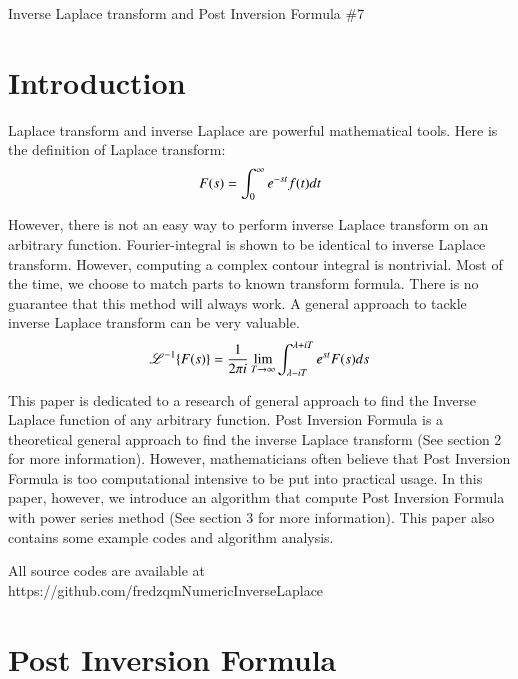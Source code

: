 \documentclass[12pt]{article}
\begin{document}
\centerline{\Large Inverse Laplace transform and Post Inversion Formula \#7}
\vspace{1cm}

\newsavebox\foobox
\newlength{\foodim}
\newcommand{\slantbox}[2][0]{\mbox{%
        \sbox{\foobox}{#2}%
        \foodim=#1\wd\foobox
        \hskip \wd\foobox
        \hskip -0.5\foodim
        \pdfsave
        \pdfsetmatrix{1 0 #1 1}%
        \llap{\usebox{\foobox}}%
        \pdfrestore
        \hskip 0.5\foodim
}}
\def\Laplace{\ThisStyle{\slantbox[-.45]{$\SavedStyle\mathscr{L}$}}}


\section{Introduction}

Laplace transform and inverse Laplace are powerful mathematical tools. Here is the definition of Laplace transform:
$$F(s) = \int_{0}^{\infty} e^{-st} f(t) dt$$

However, there is not an easy way to perform inverse Laplace transform on an arbitrary function. Fourier-integral is shown to be identical to inverse Laplace transform. However, computing a complex contour integral is nontrivial. Most of the time, we choose to match parts to known transform formula. There is no guarantee that this method will always work. A general approach to tackle inverse Laplace transform can be very valuable.
$$ \mathscr{L}^{-1}\{ F(s) \} = \frac{1}{2\pi i}\lim_{T \rightarrow \infty} \int_{\lambda - i T}^{\lambda + i T} e^{s t} F(s) ds $$

This paper is dedicated to a research of general approach to find the Inverse Laplace function of any arbitrary function. Post Inversion Formula is a theoretical general approach to find the inverse Laplace transform (See section 2 for more information). \cite{PI} However, mathematicians often believe that Post Inversion Formula is too computational intensive to be put into practical usage. In this paper, however, we introduce an algorithm that compute Post Inversion Formula with power series method (See section 3 for more information). This paper also contains some example codes and algorithm analysis.

All source codes are available at 
https://github.com/fredzqmNumericInverseLaplace


\section{Post Inversion Formula}
\end{document}
